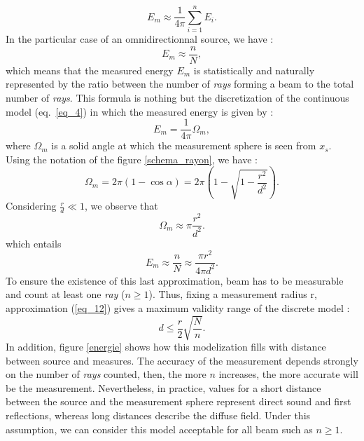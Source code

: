 \documentclass[AMA,STIX1COL]{WileyNJD-v2}
\begin{document}
\begin{equation}
E_m \approx  \frac{1}{4\pi}  \sum_{i=1}^n E_i.
\end{equation}
In the particular case of an omnidirectionnal source, we have : 
\begin{equation}
E_m \approx  \frac{n}{N},
\label{eq_7}
\end{equation}
which means that the measured energy $E_m$ is statistically and naturally represented by the ratio between the number of \textit{rays} forming a beam to the total number of \textit{rays}. This formula is nothing but the discretization of the continuous model (eq.~\ref{eq_4}) in which the measured energy is given by :
\begin{equation}
E_m = \frac{1}{4\pi}  \Omega_m,
\end{equation}
where $\Omega_m$ is a solid angle at which the measurement sphere is seen from $x_s$. Using the notation of the figure \ref{schema_rayon}, we have :%
\begin{equation}
\Omega_m = 2\pi(1-\cos{\alpha}) = 2\pi \left( 1 - \sqrt{1-\frac{r^2}{d^2}} \right).
\end{equation}
Considering $\frac{r}{d} \ll 1$, we observe that
\begin{equation}
\Omega_m \approx \pi \frac{r^2}{d^2}.
\end{equation}
which entails
\begin{equation}
E_m \approx  \frac{n}{N} \approx  \frac{\pi r^2}{4\pi d^2}.
\label{eq_12}
\end{equation}
To ensure the existence of this last approximation, beam has to be measurable and count at least one \textit{ray} ($n\geq1$). Thus, fixing a measurement radius r, approximation (\ref{eq_12}) gives a maximum validity range of the discrete model :  
\begin{equation}
\label{eq_13}
	d \leq \frac{r}{2}\sqrt{\frac{N}{n}}.
\end{equation}
In addition, figure \ref{energie} shows how this modelization fills with distance between source and measures. The accuracy of the measurement depends strongly on the number of  \textit{rays} counted, then, the more $n$ increases, the more accurate will be the measurement. Nevertheless, in practice, values for a short distance between the source and the measurement sphere represent direct sound and first reflections, whereas long distances describe the diffuse field. Under this assumption, we can consider this model acceptable for all beam such as $n\geq1$. 
\end{document}
